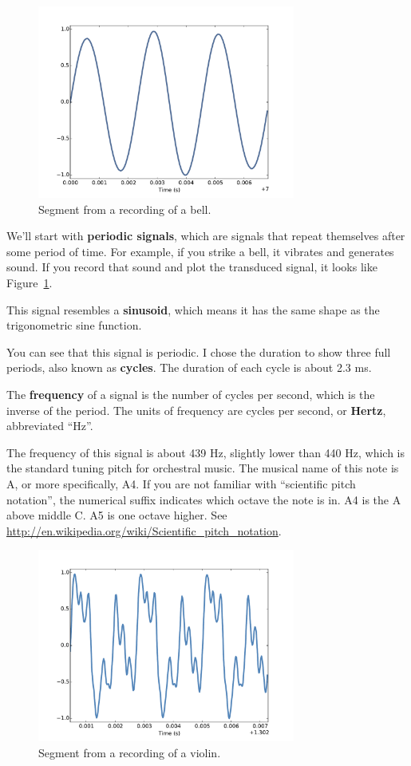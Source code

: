 \documentclass[12pt]{book}
\begin{document}
\begin{figure}
\centerline{\includegraphics[height=2.5in]{figs/sounds1.pdf}}
\caption{Segment from a recording of a bell.}
\label{fig.sounds1}
\end{figure}

We'll start with {\bf periodic signals}, which are signals that
repeat themselves after some period of time.  For example, if you
strike a bell, it vibrates and generates sound.  If you record
that sound and plot the transduced signal, it looks like
Figure~\ref{fig.sounds1}.

This signal resembles a {\bf sinusoid}, which means it has the same
shape as the trigonometric sine function.

You can see that this signal is periodic.  I chose the duration
to show three full periods, also known as {\bf cycles}.
The duration of each cycle is about 2.3 ms.

The {\bf frequency} of a signal is the number of cycles
per second, which is the inverse of the period.
The units of frequency are cycles per second, or {\bf Hertz},
abbreviated ``Hz''.

The frequency of this signal is about 439 Hz, slightly lower than 440
Hz, which is the standard tuning pitch for orchestral music.  The
musical name of this note is A, or more specifically, A4.  If you are
not familiar with ``scientific pitch notation'', the numerical suffix
indicates which octave the note is in.  A4 is the A above middle C.
A5 is one octave higher.  See
\url{http://en.wikipedia.org/wiki/Scientific_pitch_notation}.

\begin{figure}
\centerline{\includegraphics[height=2.5in]{figs/sounds2.pdf}}
\caption{Segment from a recording of a violin.}
\label{fig.sounds2}
\end{figure}
\end{document}
